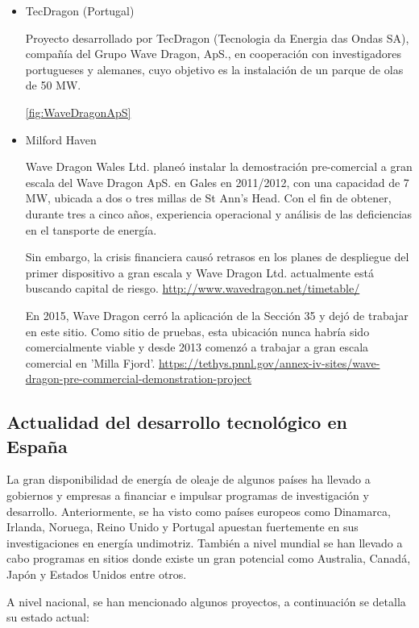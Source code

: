\begin{itemize}
\begin{itemize}
  \item
    TecDragon (Portugal)

    Proyecto desarrollado por TecDragon (Tecnologia da Energia das Ondas
    SA), compañía del Grupo Wave Dragon, ApS., en cooperación con
    investigadores portugueses y alemanes, cuyo objetivo es la
    instalación de un parque de olas de 50 MW.

    \autoref{fig:WaveDragonApS}

  \item
    Milford Haven

    Wave Dragon Wales Ltd. planeó instalar la demostración pre-comercial
    a gran escala del Wave Dragon ApS. en Gales en 2011/2012, con una
    capacidad de 7 MW, ubicada a dos o tres millas de St Ann's Head. Con
    el fin de obtener, durante tres a cinco años, experiencia
    operacional y análisis de las deficiencias en el tansporte de
    energía.

    Sin embargo, la crisis financiera causó retrasos en los planes de
    despliegue del primer dispositivo a gran escala y Wave Dragon Ltd.
    actualmente está buscando capital de riesgo.
    \url{http://www.wavedragon.net/timetable/}

    En 2015, Wave Dragon cerró la aplicación de la Sección 35 y dejó de
    trabajar en este sitio. Como sitio de pruebas, esta ubicación nunca
    habría sido comercialmente viable y desde 2013 comenzó a trabajar a
    gran escala comercial en 'Milla Fjord'.
    \url{https://tethys.pnnl.gov/annex-iv-sites/wave-dragon-pre-commercial-demonstration-project}
  \end{itemize}
\end{itemize}

\subsection{Actualidad del desarrollo tecnológico en España}\label{header-n430}

La gran disponibilidad de energía de oleaje de algunos países ha llevado
a gobiernos y empresas a financiar e impulsar programas de investigación
y desarrollo. Anteriormente, se ha visto como países europeos como
Dinamarca, Irlanda, Noruega, Reino Unido y Portugal apuestan fuertemente
en sus investigaciones en energía undimotriz. También a nivel mundial se
han llevado a cabo programas en sitios donde existe un gran potencial
como Australia, Canadá, Japón y Estados Unidos entre otros.

A nivel nacional, se han mencionado algunos proyectos, a continuación se
detalla su estado actual:

